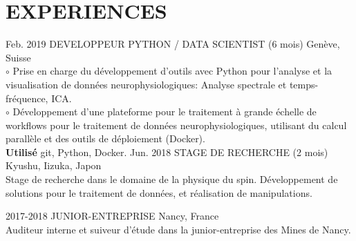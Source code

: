\documentclass[]{cv-style}          %
\begin{document}
\section{EXPERIENCES}
\begin{entrylist}
\entry
  {Feb. 2019}
  {DEVELOPPEUR PYTHON / DATA SCIENTIST (6 mois)}
  {Genève, Suisse}
  {\\
  $\circ$ Prise en charge du développement d'outils avec Python pour l'analyse et la visualisation de données neurophysiologiques: Analyse spectrale et temps-fréquence, ICA.\\
  $\circ$ Développement d'une plateforme pour le traitement à grande échelle de workflows pour le traitement de données neurophysiologiques, utilisant du calcul parallèle et des outils de déploiement (Docker). \\
  \textbf{Utilisé} git, Python, Docker.
  \vspace{0.2cm}
  }
\entry
  {Jun. 2018}
  {STAGE DE RECHERCHE (2 mois)}
  {Kyushu, Iizuka, Japon}
  {\\
  Stage de recherche dans le domaine de la physique du spin. Développement de solutions pour le traitement de données, et réalisation de manipulations. 
  \vspace{0.2cm}
  }
  
\entry
  {2017-2018}
  {JUNIOR-ENTREPRISE}
  {Nancy, France}
  {\\
  Auditeur interne et suiveur d'étude dans la junior-entreprise des Mines de Nancy.
  \vspace{0.2cm}
  }
\end{entrylist}
%

\newpage
\hphantom\\
\end{document}
